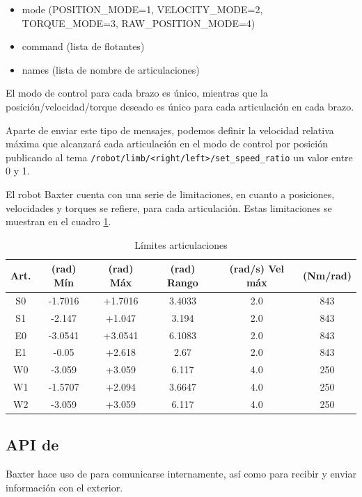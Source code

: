 \begin{itemize}
\item mode (POSITION\_MODE=1, VELOCITY\_MODE=2,\\TORQUE\_MODE=3, RAW\_POSITION\_MODE=4)
\item command (lista de flotantes)
\item names (lista de nombre de articulaciones)
\end{itemize}

El modo de control para cada brazo es único, mientras que la posición/velocidad/torque deseado es único para cada articulación en cada brazo.

Aparte de enviar este tipo de mensajes, podemos definir la velocidad relativa máxima que alcanzará cada articulación en el modo de control por posición publicando al tema \texttt{/robot/limb/<right/left>/set\_speed\_ratio} un valor entre 0 y 1.

El robot Baxter cuenta con una serie de limitaciones, en cuanto a posiciones, velocidades y torques se refiere, para cada articulación. Estas limitaciones se muestran en el cuadro \ref{tab:desarrollo/limits}.

\begin{table}[]
\centering
\caption{Límites articulaciones}
\label{tab:desarrollo/limits}
\begin{tabular}{cccccc}
Art.                    & (rad) Mín & (rad) Máx & (rad) Rango & (rad/s) Vel máx & (Nm/rad) \\ \hline
\multicolumn{1}{c|}{S0} & -1.7016   & +1.7016   & 3.4033      & 2.0             & 843      \\
\multicolumn{1}{c|}{S1} & -2.147    & +1.047    & 3.194       & 2.0             & 843      \\
\multicolumn{1}{c|}{E0} & -3.0541   & +3.0541   & 6.1083      & 2.0             & 843      \\
\multicolumn{1}{c|}{E1} & -0.05     & +2.618    & 2.67        & 2.0             & 843      \\
\multicolumn{1}{c|}{W0} & -3.059    & +3.059    & 6.117       & 4.0             & 250      \\
\multicolumn{1}{c|}{W1} & -1.5707   & +2.094    & 3.6647      & 4.0             & 250      \\
\multicolumn{1}{c|}{W2} & -3.059    & +3.059    & 6.117       & 4.0             & 250     
\end{tabular}
\end{table}

\subsection{API de \ros}\label{sec:api-de-ros}
Baxter hace uso de \ros para comunicarse internamente, así como para recibir y enviar información con el exterior.

